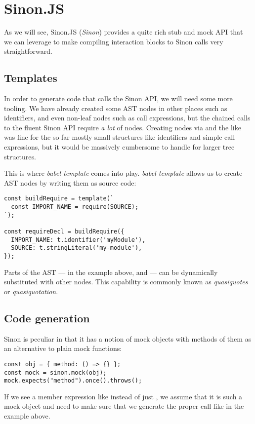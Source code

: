 \section{Sinon.JS}
As we will see,
Sinon.JS (\textit{Sinon}) provides a
quite rich stub and mock API
that we can leverage to make
compiling interaction blocks
to Sinon calls very straightforward.

\subsection{Templates}
In order to generate code that calls the Sinon API,
we will need some more tooling.
We have already created some AST nodes in other places such as identifiers,
and even non-leaf nodes such as call expressions,
but the chained calls to the fluent Sinon API
require \textit{a lot} of nodes.
Creating nodes via  and the like was fine
for the so far mostly small structures like
identifiers and simple call expressions,
but it would be massively cumbersome to handle
for larger tree structures.

This is where \textit{babel-template} comes into play.
\textit{babel-template} allows us to create AST nodes
by writing them as source code:
\autocite{BabelTemplateDoc}
\begin{verbatim}
const buildRequire = template(`
  const IMPORT_NAME = require(SOURCE);
`);

const requireDecl = buildRequire({
  IMPORT_NAME: t.identifier('myModule'),
  SOURCE: t.stringLiteral('my-module'),
});
\end{verbatim}
Parts of the AST
--- in the example above,  and  ---
can be dynamically substituted with other nodes.
This capability is commonly known as
\textit{quasiquotes} or \textit{quasiquotation}.
\autocite{LispQuasiquotation}

\subsection{Code generation}
Sinon is peculiar in that it has a notion of
mock objects with methods of them
as an alternative to plain mock functions:
\autocite{SinonMockDoc}
\begin{verbatim}
const obj = { method: () => {} };
const mock = sinon.mock(obj);
mock.expects("method").once().throws();
\end{verbatim}
If we see a member expression like
instead of just
,
we assume that it is such a mock object
and need to make sure that
we generate the proper  call
like in the example above.

